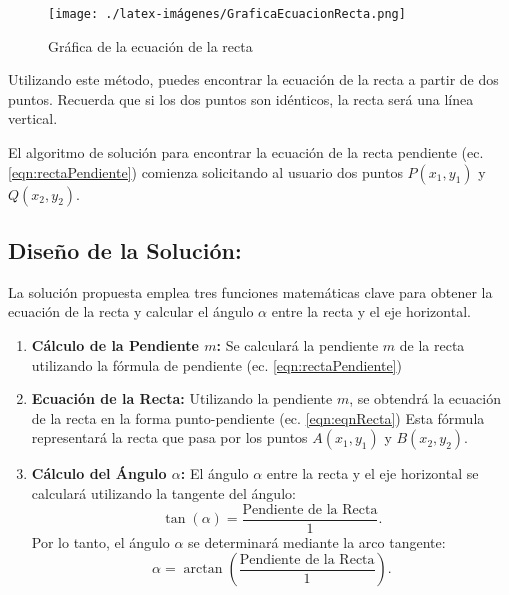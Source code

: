\begin{figure}[h!]
    \centering
    \texttt{[image: ./latex-imágenes/GraficaEcuacionRecta.png]}
    \caption{Gráfica de la ecuación de la recta}
    \label{fig:GraficaEcuacionRecta}
\end{figure}

Utilizando este método, puedes encontrar la ecuación de la recta a partir de dos puntos. Recuerda que si los dos puntos son idénticos, la recta será una línea vertical.

El algoritmo de solución para encontrar la ecuación de la recta pendiente (ec. \ref{eqn:rectaPendiente}) comienza solicitando al usuario dos puntos \(P(x_{1}, y_{1})\) y \(Q(x_{2}, y_{2})\).

\subsection{\textbf{Diseño de la Solución:}}

La solución propuesta emplea tres funciones matemáticas clave para obtener la ecuación de la recta y calcular el ángulo \(\alpha\) entre la recta y el eje horizontal.

\begin{enumerate}
    \item \textbf{Cálculo de la Pendiente \(m\):} Se calculará la pendiente \(m\) de la recta utilizando la fórmula de pendiente
    (ec. \ref{eqn:rectaPendiente})
    
    \item \textbf{Ecuación de la Recta:} Utilizando la pendiente \(m\), se obtendrá la ecuación de la recta en la forma punto-pendiente 
    (ec. \ref{eqn:eqnRecta})
    Esta fórmula representará la recta que pasa por los puntos \(A(x_{1}, y_{1})\) y \(B(x_{2}, y_{2})\).
    
    \item \textbf{Cálculo del Ángulo \(\alpha\):} El ángulo \(\alpha\) entre la recta y el eje horizontal se calculará utilizando la tangente del ángulo:
    \begin{equation}
        \tan(\alpha) = \frac{\text{Pendiente de la Recta}}{1}.
        \label{eqn:tangente}
    \end{equation}
    Por lo tanto, el ángulo \(\alpha\) se determinará mediante la arco tangente:
    \begin{equation}
        \alpha = \arctan\left(\frac{\text{Pendiente de la Recta}}{1}\right).
        \label{eqn:angulo}
    \end{equation}
\end{enumerate}

